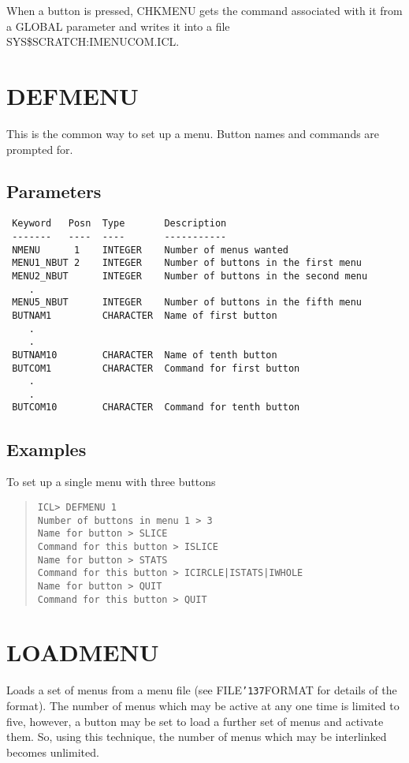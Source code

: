 \documentclass{book}
\renewcommand{\_}{{\tt\char'137}}     %
\begin{document}
When a button is pressed, CHKMENU gets the command associated with it
from a GLOBAL parameter and writes it into a file
SYS\$SCRATCH:IMENUCOM.ICL.

\section{DEFMENU}
This is the common way to set up a menu. Button names and commands
are prompted for.

\subsection{Parameters}
\begin{verbatim}
 Keyword   Posn  Type       Description
 -------   ----  ----       -----------
 NMENU      1    INTEGER    Number of menus wanted
 MENU1_NBUT 2    INTEGER    Number of buttons in the first menu
 MENU2_NBUT      INTEGER    Number of buttons in the second menu
    .
 MENU5_NBUT      INTEGER    Number of buttons in the fifth menu
 BUTNAM1         CHARACTER  Name of first button
    .
    .
 BUTNAM10        CHARACTER  Name of tenth button
 BUTCOM1         CHARACTER  Command for first button
    .
    .
 BUTCOM10        CHARACTER  Command for tenth button

\end{verbatim}\subsection{Examples}
To set up a single menu with three buttons
\begin{quote}\begin{verbatim}
ICL> DEFMENU 1
Number of buttons in menu 1 > 3
Name for button > SLICE
Command for this button > ISLICE
Name for button > STATS
Command for this button > ICIRCLE|ISTATS|IWHOLE
Name for button > QUIT
Command for this button > QUIT
\end{verbatim}\end{quote}
\section{LOADMENU}
Loads a set of menus from a menu file (see FILE\_FORMAT for details
of the format). The number of menus which may be active at any one
time is limited to five, however, a button may be set to load a
further set of menus and activate them. So, using this technique,
the number of menus which may be interlinked becomes unlimited.
\end{document}

